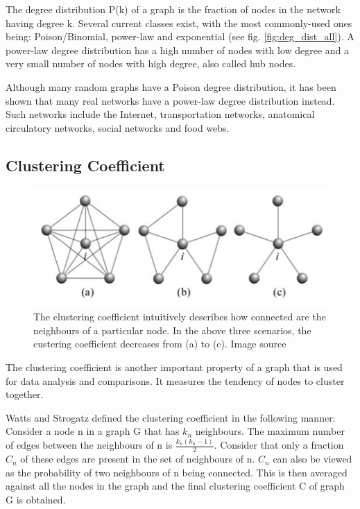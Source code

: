The degree distribution P(k) of a graph is the fraction of nodes in the network
having degree k. Several current classes exist, with the most commonly-used
ones being: Poison/Binomial, power-law and exponential (see fig.
\ref{fig:deg_dist_all}). A power-law degree distribution has a high number of
nodes with low degree and a very small
number of nodes with high degree, also called hub nodes.

Although many random graphs have a Poison degree distribution, it has been shown
that many real networks have a power-law degree distribution instead. Such
networks include the Internet, transportation networks, anatomical circulatory
networks, social networks and food webs.

\subsection{Clustering Coefficient}

\begin{figure}[h]
  \centering
\includegraphics[scale=0.7]{images/clust_coeff.png}
\caption{The clustering coefficient intuitively describes how connected are
the neighbours of a particular node. In the above three scenarios, the
custering coefficient decreases from (a) to (c).
Image source\cite{costa2008complex}}
\label{fig:clust_coeff}
\end{figure}

The clustering coefficient is another important property of a graph that is used
for data analysis and comparisons. It measures the tendency of nodes to
cluster together. 

Watts and Strogatz defined the clustering
coefficient in the following manner: Consider a node n in a graph G that has $
k_n $ neighbours. The maximum number of edges between the neighbours of n is $
\frac{k_n (k_n - 1)}{2} $. Consider that only a fraction $ C_n $ of these edges
are present in the set of neighbours of n. $ C_n $ can also be viewed as the
probability of two neighbours of n being connected. This is then averaged
against all the nodes in the graph and the final clustering coefficient C of
graph G is obtained.  

